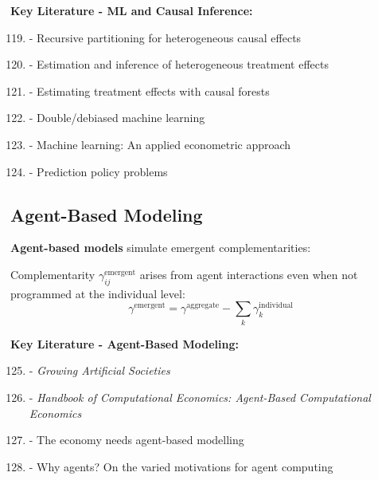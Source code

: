 \textbf{Key Literature - ML and Causal Inference:}
\begin{enumerate}[noitemsep]
    \setcounter{enumi}{118}
    \item \citet{athey2016} - Recursive partitioning for heterogeneous causal effects
    \item \citet{wager2018} - Estimation and inference of heterogeneous treatment effects
    \item \citet{athey2019} - Estimating treatment effects with causal forests
    \item \citet{chernozhukov2018} - Double/debiased machine learning
    \item \citet{mullainathan2017} - Machine learning: An applied econometric approach
    \item \citet{kleinberg2015} - Prediction policy problems
\end{enumerate}

\subsection{Agent-Based Modeling}
\label{subsec:abm}

\textbf{Agent-based models} simulate emergent complementarities:

\begin{definition}
Complementarity $\gamma_{ij}^{\text{emergent}}$ arises from agent interactions even when not programmed at the individual level:
\begin{equation}
\gamma^{\text{emergent}} = \gamma^{\text{aggregate}} - \sum_k \gamma_k^{\text{individual}}
\end{equation}
\end{definition}

\textbf{Key Literature - Agent-Based Modeling:}
\begin{enumerate}[noitemsep]
    \setcounter{enumi}{124}
    \item \citet{epstein1996} - \textit{Growing Artificial Societies}
    \item \citet{tesfatsion2006} - \textit{Handbook of Computational Economics: Agent-Based Computational Economics}
    \item \citet{farmer2009} - The economy needs agent-based modelling
    \item \citet{axtell2000} - Why agents? On the varied motivations for agent computing
\end{enumerate}

